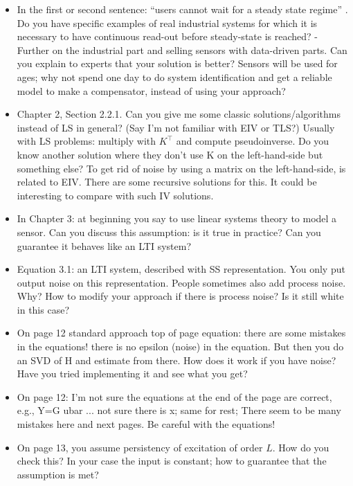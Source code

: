 \documentclass[11pt]{article}
\begin{document}
\begin{itemize}
	\item In the first or second sentence: “users cannot wait for a steady state regime” . Do you have specific examples of real industrial systems for which it is necessary to have continuous read-out before steady-state is reached? - Further on the industrial part and selling sensors with data-driven parts. Can you explain to experts that your solution is better? Sensors will be used for ages; why not spend one day to do system identification and get a reliable model to make a compensator, instead of using your approach?
	
	\item  Chapter 2, Section 2.2.1. Can you give me some classic solutions/algorithms instead of LS in general? (Say I'm not familiar with EIV or TLS?) Usually with LS problems: multiply with $K^\top$ and compute pseudoinverse. Do you know another solution where they don't use K on the left-hand-side but something else? To get rid of noise by using a matrix on the left-hand-side, is related to EIV. There are some recursive solutions for this. It could be interesting to compare with such IV solutions.
	
	\item  In Chapter 3: at beginning you say to use linear systems theory to model a sensor. Can you discuss this assumption: is it true in practice? Can you guarantee it behaves like an LTI system?

	\item  Equation 3.1: an LTI system, described with SS representation. You only put output noise on this representation. People sometimes also add process noise. Why? How to modify your approach if there is process noise? Is it still white in this case?	

	\item  On page 12 standard approach top of page equation: there are some mistakes in the equations! there is no epsilon (noise) in the equation. But then you do an SVD of H and estimate from there. How does it work if you have noise? Have you tried implementing it and see what you get?
		
	\item  On page 12: I’m not sure the equations at the end of the page are correct, e.g., Y=G ubar ... not sure there is x; same for rest; There seem to be many mistakes here and next pages. Be careful with the equations!
	
	\item  On page 13, you assume persistency of excitation of order $L$. How do you check this? In your case the input is constant; how to guarantee that the assumption is met?
	

\end{itemize}
\end{document}
